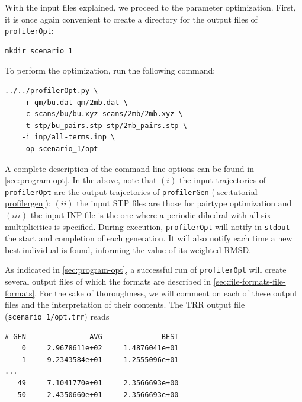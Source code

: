 \documentclass[10pt,a4paper,openany]{memoir}
\numberwithin{equation}{section}
\newcommand{\under}{\_}
\newcommand{\profileropt}[0]{\texttt{profilerOpt}}
\newcommand{\profilergen}[0]{\texttt{profilerGen}}
\begin{document}
With the input files explained, we proceed to the parameter
optimization.
%
First, it is once again convenient to create a directory for the
output files of \profileropt{}:

\begin{lstlisting}
mkdir scenario_1
\end{lstlisting}\vspace{1ex}\par

\noindent To perform the optimization, run the following command:

\begin{lstlisting}
../../profilerOpt.py \
    -r qm/bu.dat qm/2mb.dat \
    -c scans/bu/bu.xyz scans/2mb/2mb.xyz \
    -t stp/bu_pairs.stp stp/2mb_pairs.stp \
    -i inp/all-terms.inp \
    -op scenario_1/opt
\end{lstlisting}\vspace{1ex}\par

\noindent A complete description of the command-line options can be
found in \autoref{sec:program-opt}.
%
In the above, note that $(i)$ the input trajectories of \profileropt{}
are the output trajectories of \profilergen{}
(\autoref{sec:tutorial-profilergen});
%
$(ii)$ the input STP files are those for pairtype optimization
%
and $(iii)$ the input INP file is the one where a periodic dihedral
with all six multiplicities is specified.
%
During execution, \profileropt{} will notify in \texttt{stdout} the
start and completion of each generation.
%
It will also notify each time a new best individual is found,
informing the value of its weighted RMSD.
%

As indicated in \autoref{sec:program-opt}, a successful run of
\profileropt{} will create several output files of which the formats
are described in \autoref{sec:file-formats-file-formats}.
%
For the sake of thoroughness, we will comment on each of these output
files and the interpretation of their contents.
%
The TRR output file (\texttt{scenario\under{}1/opt.trr}) reads

\begin{lstlisting}
# GEN               AVG              BEST
    0     2.9678611e+02     1.4876041e+01
    1     9.2343584e+01     1.2555096e+01
...
   49     7.1041770e+01     2.3566693e+00
   50     2.4350660e+01     2.3566693e+00
\end{lstlisting}\vspace{1ex}\par
\end{document}
